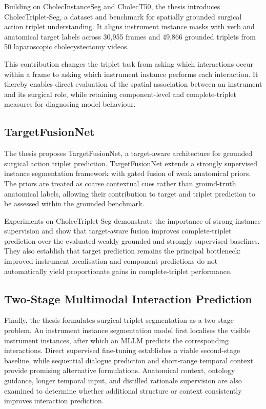 Building on CholecInstanceSeg and CholecT50, the thesis introduces CholecTriplet-Seg, a dataset and benchmark for spatially grounded surgical action triplet understanding. It aligns instrument instance masks with verb and anatomical target labels across 30,955 frames and 49,866 grounded triplets from 50 laparoscopic cholecystectomy videos.

This contribution changes the triplet task from asking which interactions occur within a frame to asking which instrument instance performs each interaction. It thereby enables direct evaluation of the spatial association between an instrument and its surgical role, while retaining component-level and complete-triplet measures for diagnosing model behaviour.

\subsection{TargetFusionNet}
\label{sec:introduction-contribution-targetfusionnet}

The thesis proposes TargetFusionNet, a target-aware architecture for grounded surgical action triplet prediction. TargetFusionNet extends a strongly supervised instance segmentation framework with gated fusion of weak anatomical priors. The priors are treated as coarse contextual cues rather than ground-truth anatomical labels, allowing their contribution to target and triplet prediction to be assessed within the grounded benchmark.

Experiments on CholecTriplet-Seg demonstrate the importance of strong instance supervision and show that target-aware fusion improves complete-triplet prediction over the evaluated weakly grounded and strongly supervised baselines. They also establish that target prediction remains the principal bottleneck: improved instrument localisation and component predictions do not automatically yield proportionate gains in complete-triplet performance.

\subsection{Two-Stage Multimodal Interaction Prediction}
\label{sec:introduction-contribution-reasoning}

Finally, the thesis formulates surgical triplet segmentation as a two-stage problem. An instrument instance segmentation model first localises the visible instrument instances, after which an MLLM predicts the corresponding \vtpair interactions. Direct supervised fine-tuning establishes a viable second-stage baseline, while sequential dialogue prediction and short-range temporal context provide promising alternative formulations. Anatomical context, ontology guidance, longer temporal input, and distilled rationale supervision are also examined to determine whether additional structure or context consistently improves interaction prediction.

